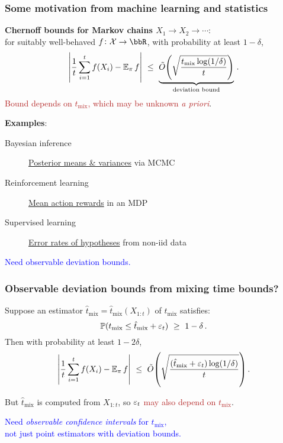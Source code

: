 \documentclass[11pt,compress,blue4]{beamer}
\newcommand{\BLUE}[1]{\textcolor{blue}{#1}}
\newcommand{\FIREBRICK}[1]{\textcolor{firebrick}{#1}}
\newcommand\tmix{\ensuremath{t_{\operatorname{mix}}}}
\newcommand\tmixhat{\ensuremath{\hat{t}_{\operatorname{mix}}}}
\newcommand\states{\ensuremath{\mathcal{X}}}
\begin{document}
\begin{frame}
  \frametitle{Some motivation from machine learning and statistics}

  \textbf{Chernoff bounds for Markov chains $X_1\to X_2\to\dotsb$}:
  \\
  for suitably well-behaved $f \colon \states \to \bbR$,
  with probability at least $1-\delta$,
  \[
    \Abs{
      \frac1t\sum_{i=1}^t f(X_i)
      -
      \E_\pi f
    }
    \ \leq \
    \underbrace{
      \tilde O\Parens{
        \sqrt{
          \frac{\tmix \log(1/\delta)}{t}
        }
      }
    }_{\text{deviation bound}}
    \,.
  \]
  \FIREBRICK{Bound depends on $\tmix$, which may be unknown \emph{a
  priori}}.

  \bigskip
  \textbf{Examples}:
  \begin{description}
    \item[Bayesian inference]
      \underline{Posterior means \& variances} via MCMC

    \item[Reinforcement learning]
      \underline{Mean action rewards} in an MDP

    \item[Supervised learning]
      \underline{Error rates of hypotheses} from non-iid data

  \end{description}

  \begin{center}
    \BLUE{%
      Need observable deviation bounds.
    }
  \end{center}

\end{frame}


\begin{frame}
  \frametitle{Observable deviation bounds from mixing time bounds?}

  Suppose an estimator $\tmixhat = \tmixhat(X_{1:t})$ of
  $\tmix$ satisfies:
  \[
    \P(\tmix \leq \tmixhat + \veps_t)
    \ \geq \
    1-\delta
    \,.
  \]
  \onslide<2->
  Then with probability at least $1-2\delta$,
  \[
    \Abs{
      \frac1t\sum_{i=1}^t f(X_i)
      -
      \E_\pi f
    }
    \ \leq \
    \tilde O\Parens{
      \sqrt{
        \frac{\parens{\tmixhat + \veps_t} \log(1/\delta)}{t}
      }
    }
    \,.
  \]

  But $\tmixhat$ is computed from $X_{1:t}$, so
  \FIREBRICK{$\varepsilon_t$ may also depend on $\tmix$}.

  \onslide<4->
  \begin{center}
    \BLUE{%
      Need \emph{observable confidence intervals} for $\tmix$, \\
      not just point estimators with deviation bounds.
    }
  \end{center}

\end{frame}
\end{document}
